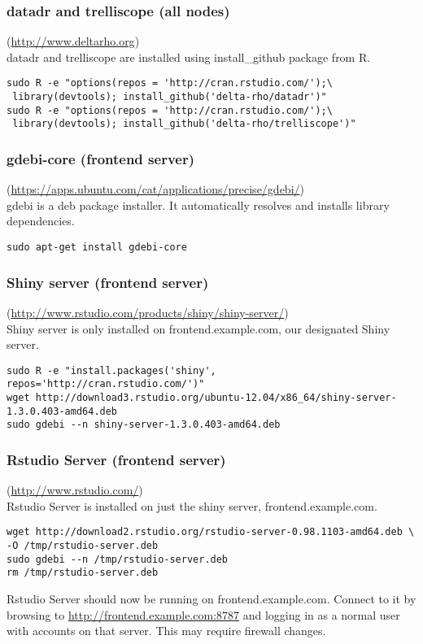 \subsubsection{datadr and trelliscope (all nodes)}(\url{http://www.deltarho.org})\\
datadr and trelliscope are installed using install\_github package from R.
\begin{verbatim}
sudo R -e "options(repos = 'http://cran.rstudio.com/');\
 library(devtools); install_github('delta-rho/datadr')"
sudo R -e "options(repos = 'http://cran.rstudio.com/');\
 library(devtools); install_github('delta-rho/trelliscope')"
\end{verbatim}

\subsubsection{gdebi-core (frontend server)}(\url{https://apps.ubuntu.com/cat/applications/precise/gdebi/})\\
gdebi is a deb package installer. It automatically resolves and installs library dependencies.
\begin{verbatim}
sudo apt-get install gdebi-core
\end{verbatim}

\subsubsection{Shiny server (frontend server)}(\url{http://www.rstudio.com/products/shiny/shiny-server/})\\

Shiny server is only installed on frontend.example.com, our designated Shiny server.

\begin{verbatim}
sudo R -e "install.packages('shiny', repos='http://cran.rstudio.com/')"
wget http://download3.rstudio.org/ubuntu-12.04/x86_64/shiny-server-1.3.0.403-amd64.deb
sudo gdebi --n shiny-server-1.3.0.403-amd64.deb
\end{verbatim}

\subsubsection{Rstudio Server (frontend server)}(\url{http://www.rstudio.com/})\\
Rstudio Server is installed on just the shiny server, frontend.example.com.
\begin{verbatim}
wget http://download2.rstudio.org/rstudio-server-0.98.1103-amd64.deb \
-O /tmp/rstudio-server.deb
sudo gdebi --n /tmp/rstudio-server.deb
rm /tmp/rstudio-server.deb
\end{verbatim}

Rstudio Server should now be running on frontend.example.com.  Connect to
it by browsing to \url{http://frontend.example.com:8787} and logging in as a
normal user with accounts on that server.  This may require firewall changes.
